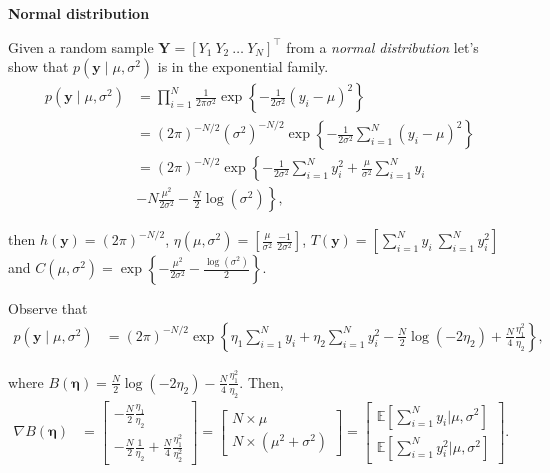 \begin{enumerate}
\textbf{Normal distribution} 

Given a random sample $\bm{Y}=[Y_1 \ Y_2 \ \dots \ Y_N]^{\top}$ from a \textit{normal distribution} let's show that $p(\bm{y}\mid \mu,\sigma^2)$ is in the exponential family.
\begin{align}
	p(\bm{y}\mid \mu,\sigma^2)&=\prod_{i=1}^N \frac{1}{2\pi\sigma^2}\exp\left\{-\frac{1}{2\sigma^2}\left(y_i-\mu\right)^2\right\}\nonumber\\
	&= (2\pi)^{-N/2}(\sigma^2)^{-N/2}\exp\left\{-\frac{1}{2\sigma^2}\sum_{i=1}^N\left(y_i-\mu\right)^2\right\}\nonumber\\
	&= (2\pi)^{-N/2}\exp\left\{-\frac{1}{2\sigma^2}\sum_{i=1}^Ny_i^2+\frac{\mu}{\sigma^2}\sum_{i=1}^N y_i\right.\nonumber\\
	&-\left.N\frac{\mu^2}{2\sigma^2}-\frac{N}{2}\log(\sigma^2)\right\}\nonumber,	
\end{align}

then $h(\bm{y})=(2\pi)^{-N/2}$, $\eta(\mu,\sigma^2)=\left[\frac{\mu}{\sigma^2} \ \frac{-1}{2\sigma^2}\right]$, $T(\bm{y})=\left[\sum_{i=1}^N y_i \ \sum_{i=1}^N y_i^2\right]$ and $C(\mu,\sigma^2)=\exp\left\{-\frac{\mu^2}{2\sigma^2}-\frac{\log(\sigma^2)}{2}\right\}$.

Observe that 
\begin{align}
	p(\bm{y}\mid \mu,\sigma^2)&= (2\pi)^{-N/2}\exp\left\{\eta_1\sum_{i=1}^N y_i+\eta_2\sum_{i=1}^Ny_i^2-\frac{N}{2}\log(-2\eta_2)+\frac{N}{4}\frac{\eta_1^2}{\eta_2}\right\}\nonumber,
\end{align}

where $B(\bm{\eta})=\frac{N}{2}\log(-2\eta_2)-\frac{N}{4}\frac{\eta_1^2}{\eta_2}$. Then,
\begin{align*}
	\nabla B(\bm{\eta}) & = \begin{bmatrix}
		-\frac{N}{2}\frac{\eta_1}{\eta_2}\\
		-\frac{N}{2}\frac{1}{\eta_2}+\frac{N}{4}\frac{\eta_1^2}{\eta_2^2}
	\end{bmatrix}
	=
	\begin{bmatrix}
		N\times\mu\\
		N\times(\mu^2+\sigma^2)
	\end{bmatrix}  = \begin{bmatrix}
		\mathbb{E}\left[\sum_{i=1}^N y_i\bigr\rvert \mu,\sigma^2\right]\\
		\mathbb{E}\left[\sum_{i=1}^N y_i^2\bigr\rvert \mu,\sigma^2\right]
	\end{bmatrix}. 
\end{align*}
\\


\end{enumerate}
